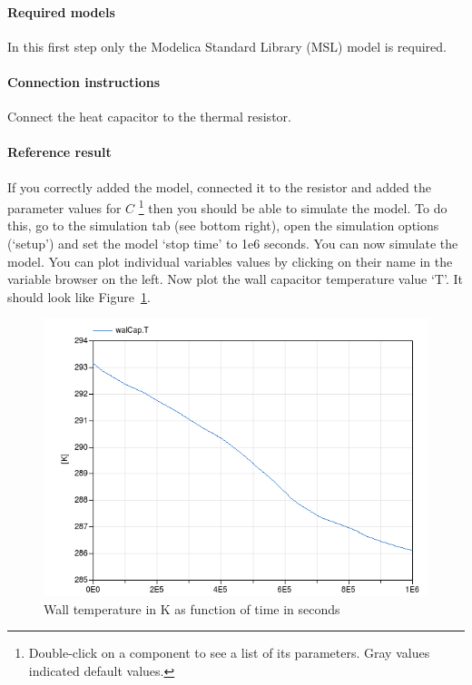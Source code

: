 \documentclass[10pt,a4paper]{article}
\begin{document}
\paragraph{Required models}
In this first step only the Modelica Standard Library (MSL) 
model 
is required.

\paragraph{Connection instructions}
Connect the heat capacitor to the thermal resistor.

\paragraph{Reference result}
If you correctly added the model, connected it to the resistor and 
added the parameter values for $C$
\footnote{Double-click on a component to see a list of its parameters. Gray values indicated default values.}
then you should be able to simulate the model.
To do this, go to the simulation tab (see bottom right),
open the simulation options (`setup')
and set the model `stop time' to 1e6 seconds.
You can now simulate the model.
You can plot individual variables values by clicking on their name in the variable browser on the left.
Now plot the wall capacitor temperature value `T'. 
It should look like Figure~\ref{fig:res1}.

\begin{figure}
\centering
\includegraphics[scale=0.6]{result1.png}
\caption{Wall temperature in K as function of time in seconds}
\label{fig:res1}
\end{figure}
\end{document}
